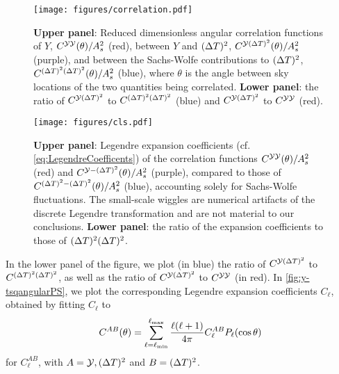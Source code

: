 \documentclass[fleqn,usenatbib]{mnras}
\begin{document}
    \begin{figure}
        \centering
        \texttt{[image: figures/correlation.pdf]}
        \caption{%
            \textbf{Upper panel}: Reduced dimensionless angular correlation
            functions of $Y$, $C^{\mathcal{YY}}(\theta)/A_s^2$ (red), between $Y$
            and $({\Delta T})^2$, $C^{\mathcal{Y}({\Delta T})^2}(\theta)/A_s^2$ (purple), and
            between the Sachs-Wolfe contributions to $({\Delta T})^2$,
            $C^{({\Delta T})^2({\Delta T})^2}(\theta)/A_s^2$ (blue), where $\theta$ is
            the angle between sky locations of the two quantities being
            correlated.  \textbf{Lower panel}: the ratio of $C^{\mathcal{Y}({\Delta T})^2}$
            to $C^{({\Delta T})^2({\Delta T})^2}$ (blue) and $C^{\mathcal{Y}({\Delta T})^2}$ to
            $C^{\mathcal{Y}\mathcal{Y}}$ (red).
        }
        \label{fig:y-tsqcorrelation}
    \end{figure}
    \begin{figure}
        \texttt{[image: figures/cls.pdf]}
        \caption{%
            \textbf{Upper panel}: Legendre expansion coefficients (cf.
            \eqref{eq:LegendreCoefficents}) of the correlation functions
            $C^{\mathcal{YY}}(\theta)/A_s^2$ (red) and
            $C^{\mathcal{Y}-({\Delta T})^2}(\theta)/A_s^2$ (purple), compared to those of
            $C^{({\Delta T})^2-({\Delta T})^2}(\theta)/A_s^2$ (blue), accounting
            solely for Sachs-Wolfe fluctuations. The small-scale wiggles are
            numerical artifacts of the discrete Legendre transformation and are
            not material to our conclusions. \textbf{Lower panel}: the ratio of
            the expansion coefficients to those of $({\Delta T})^2({\Delta T})^2$.%
        }
        \label{fig:y-tsqangularPS}
    \end{figure}

    In the lower panel of the figure, we plot (in blue) the ratio of
    $C^{\mathcal{Y}({\Delta T})^2}$ to $C^{({\Delta T})^2(\Delta T)^2}$, as well as the ratio
    of $C^{\mathcal{Y}({\Delta T})^2}$ to $C^{\mathcal{Y}\mathcal{Y}}$ (in red).  In
    \autoref{fig:y-tsqangularPS}, we plot the corresponding Legendre expansion
    coefficients $C_\ell$, obtained by fitting $C_\ell$ to
    \begin{equation} \label{eq:LegendreCoefficents}
        C^{AB}(\theta) = \sum\limits_{\ell=\ell_{\rm min}}^{\ell_{\rm max}}
            \frac{\ell(\ell+1)}{4\pi}C^{AB}_\ell P_\ell(\cos\theta)
    \end{equation}
    for $C^{AB}_\ell$, with $A=\mathcal{Y},({\Delta T})^2$ and $B=({\Delta T})^2$.
\end{document}
